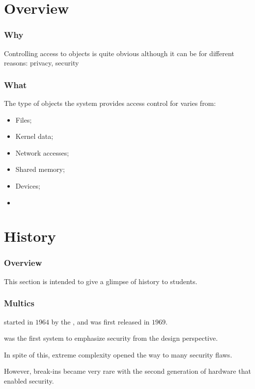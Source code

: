%
%

\section{Overview}


\begin{frame}
  \frametitle{Why}

  Controlling access to objects is quite obvious although it can be for
  different reasons: privacy, security \etc{}
\end{frame}


\begin{frame}
  \frametitle{What}

  The type of objects the system provides access control for varies from:

  \begin{itemize}
    \item
      Files;
    \item
      Kernel data;
    \item
      Network accesses;
    \item
      Shared memory;
    \item
      Devices;
    \item
      \etc{}
  \end{itemize}
\end{frame}

%
%

\section{History}


\begin{frame}
  \frametitle{Overview}

  This section is intended to give a glimpse of history to students.
\end{frame}


\begin{frame}
  \frametitle{Multics}

  started in $1964$ by the ,  and
   was first released in $1969$.

  \-

   was the first system to emphasize security from the
  design perspective.

  \-

  In spite of this,  extreme complexity opened the way to many
  security flaws.

  \-

  However, break-ins became very rare with the second generation of hardware
  that enabled  security.
\end{frame}

